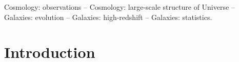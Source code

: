 \documentclass[useAMS,usenatbib]{mnras}
\newcommand{\ssfr}{$\mbox{sSFR}$\xspace}
\newcommand{\hagn}{\mbox{{\sc \small Horizon-AGN}}}
\begin{document}
\begin{abstract}

\end{abstract}

\begin{keywords}
  Cosmology: observations -- Cosmology: large-scale structure of Universe --
  Galaxies: evolution -- Galaxies: high-redshift -- Galaxies: statistics.
\end{keywords}

\section{Introduction}
\label{sec:intro}

\newcommand{\mean}[1]{
  \langle #1
  \rangle}
\newcommand{\tr}{\mathrm{tr}}
\newcommand{\nus}{\nu_{\!\S}}
\renewcommand{\S}{\mathcal{S}}
\newcommand{\sigmas}{\sigma_\S}
\newcommand{\dd}{\mathrm{d}}
\newcommand{\kk}{\mathbf{k}}
\newcommand{\Rs}{R_\S}
\end{document}
